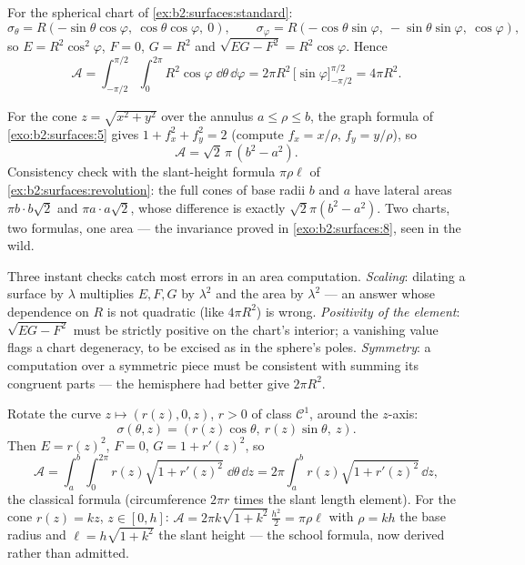 \begin{example}\label{ex:b2:surfaces:spherearea}
For the spherical chart of \cref{ex:b2:surfaces:standard}:
\[
\sigma_\theta = R(-\sin\theta\cos\varphi,\
\cos\theta\cos\varphi,\ 0),
\qquad
\sigma_\varphi = R(-\cos\theta\sin\varphi,\
-\sin\theta\sin\varphi,\ \cos\varphi),
\]
so $E = R^2\cos^2\varphi$, $F = 0$, $G = R^2$ and $\sqrt{EG - F^2}
= R^2\cos\varphi$. Hence
\[
\mathcal{A}
= \int_{-\pi/2}^{\pi/2}\!\!\int_0^{2\pi}
R^2\cos\varphi\;\dd\theta\,\dd\varphi
= 2\pi R^2\,\bigl[\sin\varphi\bigr]_{-\pi/2}^{\pi/2}
= \boxed{4\pi R^2} .
\]
\end{example}

\begin{example}\label{ex:b2:surfaces:conearea}
For the cone $z = \sqrt{x^2 + y^2}$ over the annulus $a \leq
\rho \leq b$, the graph formula of
\cref{exo:b2:surfaces:5} gives $1 + f_x^2 + f_y^2 = 2$
(compute $f_x = x/\rho$, $f_y = y/\rho$), so
\[
\mathcal A = \sqrt2\,\pi\,(b^2 - a^2) .
\]
Consistency check with the slant-height formula $\pi\rho\ell$
of \cref{ex:b2:surfaces:revolution}: the full cones of base
radii $b$ and $a$ have lateral areas $\pi b\cdot b\sqrt2$ and
$\pi a\cdot a\sqrt2$, whose difference is exactly
$\sqrt2\pi(b^2 - a^2)$. Two charts, two formulas, one area
--- the invariance proved in \cref{exo:b2:surfaces:8}, seen
in the wild.
\end{example}

\begin{remark}
Three instant checks catch most errors in an area
computation. \emph{Scaling}: dilating a surface by $\lambda$
multiplies $E, F, G$ by $\lambda^2$ and the area by
$\lambda^2$ --- an answer whose dependence on $R$ is not
quadratic (like $4\pi R^2$) is wrong. \emph{Positivity of the
element}: $\sqrt{EG - F^2}$ must be strictly positive on the
chart's interior; a vanishing value flags a chart degeneracy,
to be excised as in the sphere's poles. \emph{Symmetry}: a
computation over a symmetric piece must be consistent with
summing its congruent parts --- the hemisphere had better
give $2\pi R^2$.
\end{remark}

\begin{example}\label{ex:b2:surfaces:revolution}
Rotate the curve $z \mapsto (r(z), 0, z)$, $r > 0$ of class
$\mathcal{C}^1$, around the $z$-axis:
\[
\sigma(\theta, z) = (r(z)\cos\theta,\ r(z)\sin\theta,\ z).
\]
Then $E = r(z)^2$, $F = 0$, $G = 1 + r'(z)^2$, so
\[
\mathcal{A} = \int_a^b\!\!\int_0^{2\pi}
r(z)\sqrt{1 + r'(z)^2}\;\dd\theta\,\dd z
= 2\pi\int_a^b r(z)\sqrt{1 + r'(z)^2}\,\dd z ,
\]
the classical formula (circumference $2\pi r$ times the slant
length element). For the cone $r(z) = kz$, $z \in [0, h]$: $\mathcal
A = 2\pi k\sqrt{1 + k^2}\,\frac{h^2}{2} = \pi \rho \ell$ with
$\rho = kh$ the base radius and $\ell = h\sqrt{1 + k^2}$ the slant
height --- the school formula, now derived rather than admitted.
\end{example}

